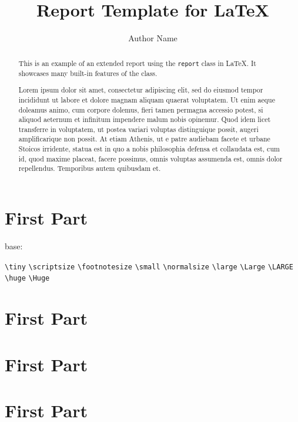 \documentclass{report}
\title{Report Template for \LaTeX}
\author{Author Name}
\begin{document}
\maketitle

\begin{abstract}
  This is an example of an extended report using the \texttt{report} class in LaTeX. It showcases many built-in features of the class.
\end{abstract}

\tableofcontents

\begin{abstract}
  Lorem ipsum dolor sit amet, consectetur adipiscing elit, sed do eiusmod tempor
  incididunt ut labore et dolore magnam aliquam quaerat voluptatem. Ut enim
  aeque doleamus animo, cum corpore dolemus, fieri tamen permagna accessio
  potest, si aliquod aeternum et infinitum impendere malum nobis opinemur.
  Quod idem licet transferre in voluptatem, ut postea variari voluptas distinguique
  possit, augeri amplificarique non possit. At etiam Athenis, ut e patre audiebam
  facete et urbane Stoicos irridente, statua est in quo a nobis philosophia defensa
  et collaudata est, cum id, quod maxime placeat, facere possimus, omnis voluptas
  assumenda est, omnis dolor repellendus. Temporibus autem quibusdam et.
\end{abstract}

\layout%

\part{First Part}

\makeatletter
base: \f@size

\verb+\tiny+ \tiny \f@size
\verb+\scriptsize+ \scriptsize \f@size
\verb+\footnotesize+ \footnotesize \f@size
\verb+\small+ \small \f@size
\verb+\normalsize+ \normalsize \f@size
\verb+\large+ \large \f@size
\verb+\Large+ \Large \f@size
\verb+\LARGE+ \LARGE \f@size
\verb+\huge+ \huge \f@size
\verb+\Huge+ \Huge \f@size
\makeatother

\part{First Part}
\part{First Part}
\part{First Part}
\end{document}
